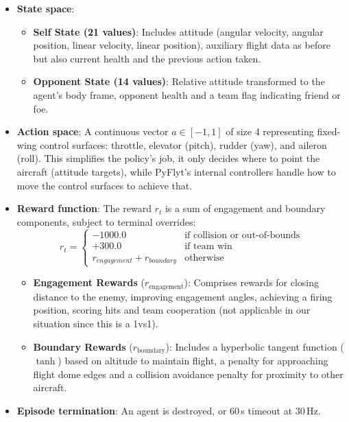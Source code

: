 \documentclass[11pt,a4paper]{article}
\begin{document}
\begin{itemize}
  \item \textbf{State space}:
  \begin{itemize}
    \item \textbf{Self State (21 values)}: Includes attitude (angular velocity, angular position, linear velocity, linear position), auxiliary flight data as before but also current health and the previous action taken.
    \item \textbf{Opponent State (14 values)}: Relative attitude transformed to the agent's body frame, opponent health and a team flag indicating friend or foe.

  \end{itemize}
  \item \textbf{Action space}: A continuous vector $a \in [-1,1]$ of size 4 representing fixed-wing control surfaces: throttle, elevator (pitch), rudder (yaw), and aileron (roll). This simplifies the policy's job, it only decides where to point the aircraft (attitude targets), while PyFlyt's internal controllers handle how to move the control surfaces to achieve that.
  \item \textbf{Reward function}: The reward $r_t$ is a sum of engagement and boundary components, subject to terminal overrides:
   \begin{equation}
     r_t =
    \begin{cases}
    -1000.0 & \text{if collision or out-of-bounds} \\
     +300.0 & \text{if team win} \\
    r_{engagement} + r_{boundary} & \text{otherwise}
    \end{cases}
    \end{equation}
    \begin{itemize}
    \item \textbf{Engagement Rewards} ($r_{\text{engagement}}$): Comprises rewards for closing distance to the enemy, improving engagement angles, achieving a firing position, scoring hits and team cooperation (not applicable in our situation since this is a 1vs1).
    \item \textbf{Boundary Rewards} ($r_{\text{boundary}}$): Includes a hyperbolic tangent function ($\tanh$) based on altitude to maintain flight, a penalty for approaching flight dome edges and a collision avoidance penalty for proximity to other aircraft.
\end{itemize}

  \item \textbf{Episode termination}: An agent is destroyed, or 60\,s timeout at 30\,Hz.
\end{itemize}
\end{document}
